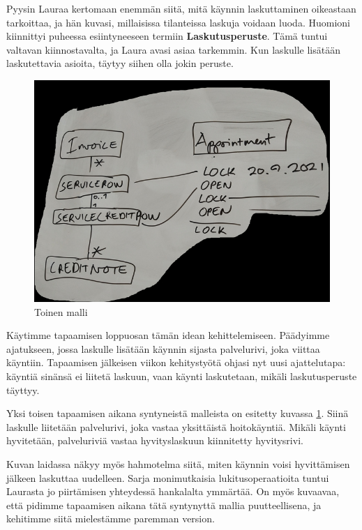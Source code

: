 Pyysin Lauraa kertomaan enemmän siitä, mitä käynnin laskuttaminen
oikeastaan tarkoittaa, ja hän kuvasi, millaisissa tilanteissa laskuja
voidaan luoda. Huomioni kiinnittyi puheessa esiintyneeseen termiin
\textbf{Laskutusperuste}. Tämä tuntui valtavan kiinnostavalta, ja Laura
avasi asiaa tarkemmin. Kun laskulle lisätään laskutettavia asioita,
täytyy siihen olla jokin peruste.

\begin{figure}
\centering
\includegraphics{illustration/malli2.jpg}
\caption{\label{malli2}Toinen malli}
\end{figure}

Käytimme tapaamisen loppuosan tämän idean kehittelemiseen. Päädyimme
ajatukseen, jossa laskulle lisätään käynnin sijasta palvelurivi, joka
viittaa käyntiin. Tapaamisen jälkeisen viikon kehitystyötä ohjasi nyt
uusi ajattelutapa: käyntiä sinänsä ei liitetä laskuun, vaan käynti
laskutetaan, mikäli laskutusperuste täyttyy.

Yksi toisen tapaamisen aikana syntyneistä malleista on esitetty kuvassa
\ref{malli2}. Siinä laskulle liitetään palvelurivi, joka vastaa
yksittäistä hoitokäyntiä. Mikäli käynti hyvitetään, palveluriviä vastaa
hyvityslaskuun kiinnitetty hyvitysrivi.

Kuvan laidassa näkyy myös hahmotelma siitä, miten käynnin voisi
hyvittämisen jälkeen laskuttaa uudelleen. Sarja monimutkaisia
lukitusoperaatioita tuntui Laurasta jo piirtämisen yhteydessä hankalalta
ymmärtää. On myös kuvaavaa, että pidimme tapaamisen aikana tätä
syntynyttä mallia puutteellisena, ja kehitimme siitä mielestämme
paremman version.

